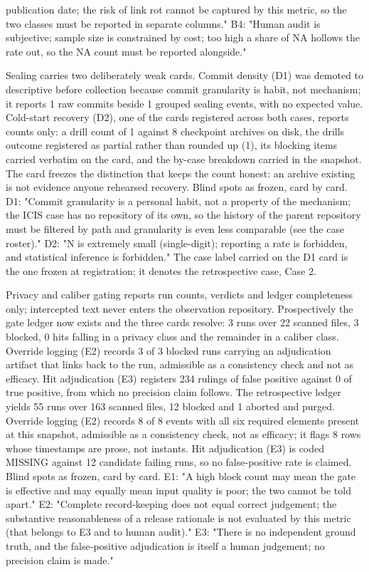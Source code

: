 \documentclass[
  english,
]{article}
\begin{document}
publication date; the risk of link rot cannot be captured by this metric, so the two classes must be reported in separate columns." B4: "Human audit is subjective; sample size is constrained by cost; too high a share of NA hollows the rate out, so the NA count must be reported alongside."

Sealing carries two deliberately weak cards. Commit density (D1) was demoted to descriptive before collection because commit granularity is habit, not mechanism; it reports 1 raw commits beside 1 grouped sealing events, with no expected value. Cold-start recovery (D2), one of the cards registered across both cases, reports counts only: a drill count of 1 against 8 checkpoint archives on disk, the drill\textquotesingle s outcome registered as partial rather than rounded up (1), its blocking items carried verbatim on the card, and the by-case breakdown carried in the snapshot. The card freezes the distinction that keeps the count honest: an archive existing is not evidence anyone rehearsed recovery. Blind spots as frozen, card by card. D1: "Commit granularity is a personal habit, not a property of the mechanism; the ICIS case has no repository of its own, so the history of the parent repository must be filtered by path and granularity is even less comparable (see the case roster)." D2: "N is extremely small (single-digit); reporting a rate is forbidden, and statistical inference is forbidden." The case label carried on the D1 card is the one frozen at registration; it denotes the retrospective case, Case 2.

Privacy and caliber gating reports run counts, verdicts and ledger completeness only; intercepted text never enters the observation repository. Prospectively the gate ledger now exists and the three cards resolve: 3 runs over 22 scanned files, 3 blocked, 0 hits falling in a privacy class and the remainder in a caliber class. Override logging (E2) records 3 of 3 blocked runs carrying an adjudication artifact that links back to the run, admissible as a consistency check and not as efficacy. Hit adjudication (E3) registers 234 rulings of false positive against 0 of true positive, from which no precision claim follows. The retrospective ledger yields 55 runs over 163 scanned files, 12 blocked and 1 aborted and purged. Override logging (E2) records 8 of 8 events with all six required elements present at this snapshot, admissible as a consistency check, not as efficacy; it flags 8 rows whose timestamps are prose, not instants. Hit adjudication (E3) is coded MISSING against 12 candidate failing runs, so no false-positive rate is claimed. Blind spots as frozen, card by card. E1: "A high block count may mean the gate is effective and may equally mean input quality is poor; the two cannot be told apart." E2: "Complete record-keeping does not equal correct judgement; the substantive reasonableness of a release rationale is not evaluated by this metric (that belongs to E3 and to human audit)." E3: "There is no independent ground truth, and the false-positive adjudication is itself a human judgement; no precision claim is made."
\end{document}
